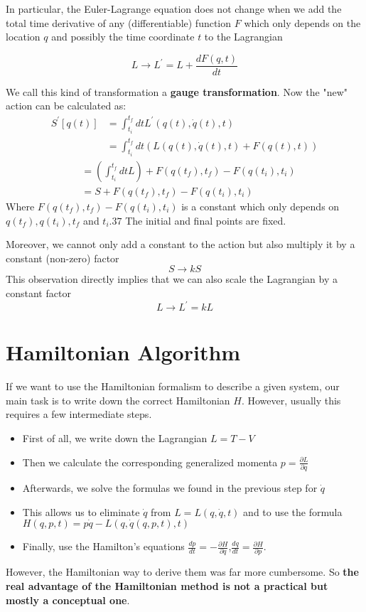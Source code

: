 In particular, the Euler-Lagrange equation does not change when we add the total time derivative of any (differentiable) function $F$ which only depends on the location $q$ and possibly the time coordinate $t$ to the Lagrangian
\begin{qt}
\begin{equation}
L \rightarrow L^{\prime}=L+\frac{d F(q, t)}{d t}
\end{equation}
\end{qt}
We call this kind of transformation a \textbf{gauge transformation}.
Now the "new" action can be calculated as:
$$
\begin{aligned}
S^{\prime}[q(t)] &=\int_{t_{i}}^{t_{f}} d t L^{\prime}(q(t), \dot{q}(t), t) \\
&=\int_{t_{i}}^{t_{f}} d t(L(q(t), \dot{q}(t), t)+F(q(t), t))
\end{aligned}
$$
$$
\begin{aligned}
&=\left(\int_{t_{i}}^{t_{f}} d t L\right)+F\left(q\left(t_{f}\right), t_{f}\right)-F\left(q\left(t_{i}\right), t_{i}\right)\\
&=S+F\left(q\left(t_{f}\right), t_{f}\right)-F\left(q\left(t_{i}\right), t_{i}\right)
\end{aligned}
$$
Where $ F\left(q\left(t_{f}\right), t_{f}\right)-F\left(q\left(t_{i}\right), t_{i}\right)$ is a constant which only depends on $q\left(t_{f}\right), q\left(t_{i}\right), t_{f}$ and $t_{i} .37$ The initial and final points are fixed.

Moreover, we cannot only add a constant to the action but also multiply it by a constant (non-zero) factor
$$
S \rightarrow k S
$$
This observation directly implies that we can also scale the Lagrangian by a constant factor
$$
L \rightarrow L^{\prime}=k L
$$

\section{Hamiltonian Algorithm}
If we want to use the Hamiltonian formalism to describe a given system, our main task is to write down the correct Hamiltonian $H$. However, usually this requires a few intermediate steps.
\begin{qt}
\begin{itemize}
    \item First of all, we write down the Lagrangian $L=T-V$
    \item Then we calculate the corresponding generalized momenta $p=\frac{\partial L}{\partial q}$
    \item Afterwards, we solve the formulas we found in the previous step for $\dot{q}$
    \item This allows us to eliminate $\dot{q}$ from $L=L(q, \dot{q}, t)$ and to use the formula $H(q, p, t)=p \dot{q}-L(q, \dot{q}(q, p, t), t)$
    \item Finally, use the Hamilton's equations $\frac{d p}{d t}=-\frac{\partial H}{\partial q}$,$\frac{d q}{d t}=\frac{\partial H}{\partial p}$.
\end{itemize}
\end{qt}
However, the Hamiltonian way to derive them was far more cumbersome. So \textbf{the real advantage of the Hamiltonian method is not a practical but mostly a conceptual one}.

